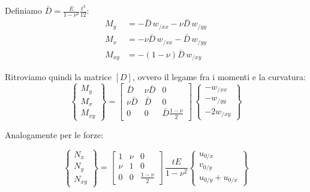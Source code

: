 Definiamo $\bar{D}=\frac{E}{1-\nu^2}\frac{t^3}{12}$:
\begin{align*}
     M_y &= -\bar{D}\,w_{/xx} -\nu \bar{D}\,w_{/yy}\\
     M_x &= -\nu \bar{D}\,w_{/xx} - \bar{D}\,w_{/yy}\\
     M_{xy} &= -(1-\nu)\bar{D}\,w_{/xy} 
\end{align*}

Ritroviamo quindi la matrice $[D]$, ovvero il legame fra i momenti e la curvatura:
\begin{equation*}
\left\{
\begin{array}{c}
M_y \\
M_x\\
M_{xy}
\end{array}
\right\} =
\left[
\begin{array}{ccc}
\displaystyle \bar{D} & \displaystyle \nu\bar{D} & \displaystyle 0\\
\displaystyle \nu\bar{D} & \displaystyle \bar{D} & \displaystyle 0 \\
\displaystyle 0& \displaystyle 0 & \displaystyle \bar{D}\frac{1-\nu}{2}
\end{array}
\right]\,
\left\{
\begin{array}{c}
-w_{/xx} \\
-w_{/yy}\\
-2w_{/xy}
\end{array}
\right\} 
\end{equation*}

Analogamente per le forze:

\begin{equation*}
\left\{
\begin{array}{c}
N_x \\
N_y\\
N_{xy}
\end{array}
\right\} =
\left[
\begin{array}{ccc}
\displaystyle 1 & \displaystyle \nu & \displaystyle 0\\
\displaystyle \nu & \displaystyle 1 & \displaystyle 0 \\
\displaystyle 0& \displaystyle 0 & \displaystyle \frac{1-\nu}{2}
\end{array}
\right]\, \frac{tE}{1-\nu^2}
\left\{
\begin{array}{c}
u_{0/x} \\
v_{0/y}\\
u_{0/y}+u_{0/x}
\end{array}
\right\} 
\end{equation*}








